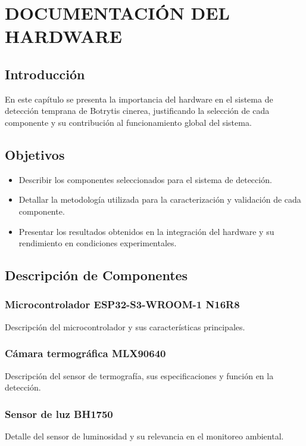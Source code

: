 \chapter{DOCUMENTACIÓN DEL HARDWARE}

\section{Introducción}
En este capítulo se presenta la importancia del hardware en el sistema de detección temprana de Botrytis cinerea, justificando la selección de cada componente y su contribución al funcionamiento global del sistema.

\section{Objetivos}
\begin{itemize}
    \item Describir los componentes seleccionados para el sistema de detección.
    \item Detallar la metodología utilizada para la caracterización y validación de cada componente.
    \item Presentar los resultados obtenidos en la integración del hardware y su rendimiento en condiciones experimentales.
\end{itemize}

\section{Descripción de Componentes}
\subsection{Microcontrolador ESP32-S3-WROOM-1 N16R8}
Descripción del microcontrolador y sus características principales.

\subsection{Cámara termográfica MLX90640}
Descripción del sensor de termografía, sus especificaciones y función en la detección.

\subsection{Sensor de luz BH1750}
Detalle del sensor de luminosidad y su relevancia en el monitoreo ambiental.

